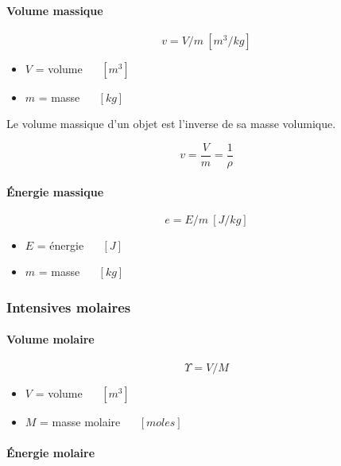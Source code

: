 \documentclass[]{article}
\providecommand{\tightlist}{%
  \setlength{\itemsep}{0pt}\setlength{\parskip}{0pt}}
\let\oldparagraph\paragraph
\renewcommand{\paragraph}[1]{\oldparagraph{#1}\mbox{}}
\begin{document}
\paragraph{Volume massique}\label{volume-massique}

$$ v = V / m ~ [ m^3 / kg ] $$

\begin{itemize}
\tightlist
\item
  $V$ = volume ~~ \([m^3]\)
\item
  $m$ = masse ~~ \([kg]\) \\
\end{itemize}

Le volume massique d’un objet est l’inverse de sa masse volumique.

$$ v = \dfrac{V}{m} = \dfrac{1}{\rho} $$

\paragraph{Énergie massique}\label{uxe9nergie-massique}

$$ e = E / m ~ [J / kg]$$

\begin{itemize}
\tightlist
\item
  $E$ = énergie ~~ $ [J] $
\item
  $m$ = masse ~~ $ [kg] $
\end{itemize}

\subsubsection{Intensives molaires}\label{intensives-molaires}

\paragraph{Volume molaire}\label{volume-molaire}

$$ \Upsilon = V/M $$

\begin{itemize}
\tightlist
\item
  $V$ = volume ~~ $ [m^3] $
\item
  $M$ = masse molaire ~~ $ [moles] $
\end{itemize}

\paragraph{Énergie molaire}\label{uxe9nergie-molaire}
\end{document}

